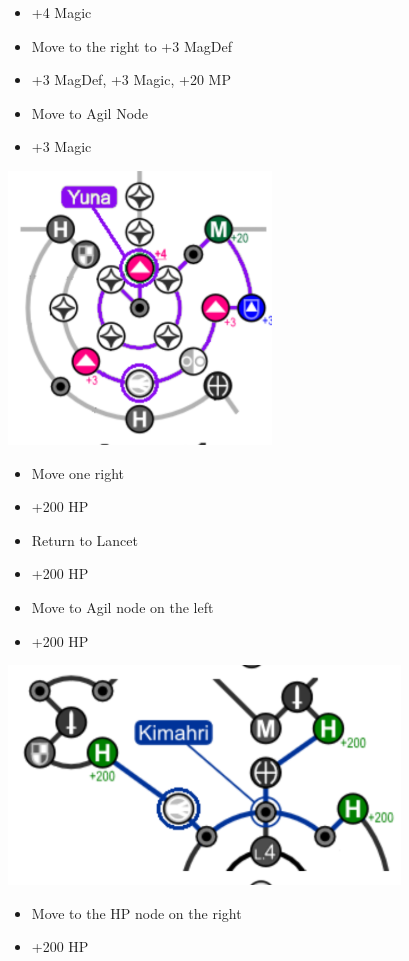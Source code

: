 \begin{spheregrid}
	\begin{itemize}
	\yunaf
	\begin{itemize}
		\item +4 Magic
		\item Move to the right to +3 MagDef
		\item +3 MagDef, +3 Magic, +20 MP
		\item Move to Agil Node
		\item +3 Magic
	\end{itemize}
	\includegraphics{graphics/yunammr}
	\kimahrif
	\begin{itemize}
		\item Move one right
		\item +200 HP
		\item Return to Lancet
		\item +200 HP
		\item Move to Agil node on the left
		\item +200 HP
	\end{itemize}
	\includegraphics{graphics/kimahrimmr}
	\wakkaf
	\begin{itemize}
		\item Move to the HP node on the right
		\item +200 HP

\end{itemize}
\end{itemize}
\end{spheregrid}
